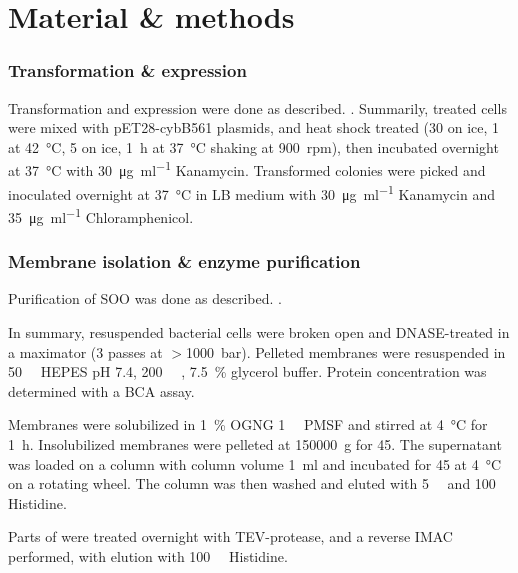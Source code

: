 \twocolumn

\part{Material \& methods}

\section{Transformation \& expression}

Transformation and expression were done as described.
\cite{superoxide_salvaging}. Summarily,  treated cells were mixed
with pET28-cybB561 plasmids, and heat shock treated (\SI{30}{\min} on ice,
\SI{1}{\min} at \SI{42}{\celsius}, \SI{5}{\min} on ice, \SI{1}{\hour} at
\SI{37}{\celsius} shaking at \SI{900}{rpm}), then incubated overnight at
\SI{37}{\celsius} with \SI{30}{\ug\per\ml} Kanamycin. Transformed colonies were
picked and inoculated overnight at \SI{37}{\celsius} in LB medium with
\SI{30}{\ug\per\ml} Kanamycin and \SI{35}{\ug\per\ml} Chloramphenicol.


\section{Membrane isolation \& enzyme purification}

Purification of SOO was done as described. \cite{superoxide_salvaging}.

In summary, resuspended bacterial cells were broken open and DNASE-treated in a
maximator (3 passes at $>$\SI{1000}{\bar}). Pelleted membranes were resuspended
in \SI{50}{\milli\Molar} HEPES pH 7.4, \SI{200}{\milli\Molar} ,
\SI{7.5}{\percent} glycerol buffer. Protein concentration was determined with a
BCA assay.

Membranes were solubilized in \SI{1}{\percent} OGNG \SI{1}{\milli\Molar} PMSF
and stirred at \SI{4}{\celsius} for \SI{1}{\hour}. Insolubilized membranes were
pelleted at \SI{150000}{g} for \SI{45}{\min}. The supernatant was loaded on a
 column with column volume \SI{1}{\ml} and incubated for
\SI{45}{\min} at \SI{4}{\celsius} on a rotating wheel. The column was then
washed and eluted with \SI{5}{\milli\Molar} and \SI{100}{\milli\Molar}
Histidine.

Parts of \hsdsred{} were treated overnight with TEV-protease, and a reverse
 IMAC performed, with elution with \SI{100}{\milli\Molar}
Histidine.

